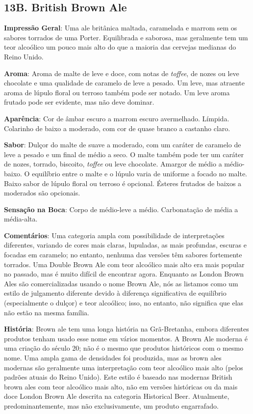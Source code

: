 \subsection*{13B. British Brown Ale}
\textbf{Impressão Geral}: Uma ale britânica maltada, caramelada e marrom sem os sabores torrados de uma Porter. Equilibrada e saborosa, mas geralmente tem um teor alcoólico um pouco mais alto do que a maioria das cervejas medianas do Reino Unido.

\textbf{Aroma}: Aroma de malte de leve e doce, com notas de \textit{toffee}, de nozes ou leve chocolate e uma qualidade de caramelo de leve a pesado. Um leve, mas atraente aroma de lúpulo floral ou terroso também pode ser notado. Um leve aroma frutado pode ser evidente, mas não deve dominar.

\textbf{Aparência}: Cor de âmbar escuro a marrom escuro avermelhado. Límpida. Colarinho de baixo a moderado, com cor de quase branco a castanho claro.

\textbf{Sabor}: Dulçor do malte de suave a moderado, com um caráter de caramelo de leve a pesado e um final de médio a seco. O malte também pode ter um caráter de nozes, torrado, biscoito, \textit{toffee} ou leve chocolate. Amargor de médio a médio-baixo. O equilíbrio entre o malte e o lúpulo varia de uniforme a focado no malte. Baixo sabor de lúpulo floral ou terroso é opcional. Ésteres frutados de baixos a moderados são opcionais.

\textbf{Sensação na Boca}: Corpo de médio-leve a médio. Carbonatação de média a média-alta.

\textbf{Comentários}: Uma categoria ampla com possibilidade de interpretações diferentes, variando de cores mais claras, lupuladas, as mais profundas, escuras e focadas em caramelo; no entanto, nenhuma das versões têm sabores fortemente torrados. Uma Double Brown Ale com teor alcoólico mais alto era mais popular no passado, mas é muito difícil de encontrar agora. Enquanto as London Brown Ales são comercializadas usando o nome Brown Ale, nós as listamos como um estilo de julgamento diferente devido à diferença significativa de equilíbrio (especialmente o dulçor) e teor alcoólico; isso, no entanto, não significa que elas não estão na mesma família.

\textbf{História}: Brown ale tem uma longa história na Grã-Bretanha, embora diferentes produtos tenham usado esse nome em vários momentos. A Brown Ale moderna é uma criação do século 20; não é o mesmo que produtos históricos com o mesmo nome. Uma ampla gama de densidades foi produzida, mas as brown ales modernas são geralmente uma interpretação com teor alcoólico mais alto (pelos padrões atuais do Reino Unido). Este estilo é baseado nas modernas British brown ales com teor alcoólico mais alto, não em versões históricas ou da mais doce London Brown Ale descrita na categoria Historical Beer. Atualmente, predominantemente, mas não exclusivamente, um produto engarrafado.

